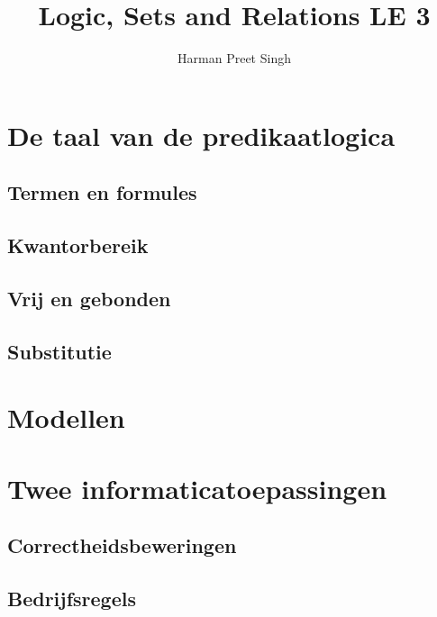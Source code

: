 \documentclass[a4paper, 12pt]{article}
\title{Logic, Sets and Relations \textemdash{} LE 3}
\author{Harman Preet Singh}
\begin{document}

\maketitle
\tableofcontents

\section{De taal van de predikaatlogica}
\subsection{Termen en formules}
\subsection{Kwantorbereik}
\subsection{Vrij en gebonden}
\subsection{Substitutie}

\section{Modellen}

\section{Twee informaticatoepassingen}
\subsection{Correctheidsbeweringen}
\subsection{Bedrijfsregels}
\end{document}
